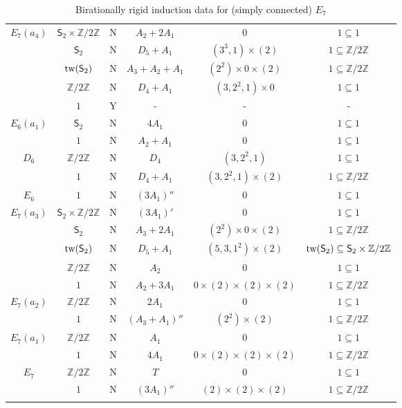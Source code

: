\documentclass[11pt]{amsart}
\newcommand{\bZ}{{\mathbb Z}}
\newcommand{\Sym}{{\mathsf{S}}}
\newcommand{\tw}{{{\mbox{\rm tw}}}}
\numberwithin{equation}{section}
\begin{document}
\begin{center}
\begin{longtable}{|c|c|c|c|c|c|}
			\hline
			$E_7(a_4)$ & $\Sym_2\times\bZ/2\bZ$ & N & $A_2 + 2 A_1$ & $0$ & $1\subseteq 1$ \\
			& $\Sym_2$ & N & $D_5 + A_1$ & $(3^3,1)\times (2)$ & $1\subseteq \bZ/2\bZ$ \\
			& $\tw(\Sym_2)$ & N & $A_3+A_2+A_1$ & $(2^2)\times 0\times (2)$ & $1\subseteq \bZ/2\bZ$ \\
			& $\bZ/2\bZ$ & N & $D_4+A_1$ & $(3,2^2,1)\times 0$ & $1\subseteq 1$ \\
			& $1$ & Y & - & - & - \\
			\hline
			$E_6(a_1)$ & $\Sym_2$ & N & $4 A_1$ & $0$ & $1\subseteq 1$ \\
			& $1$ & N & $A_2 + A_1$ & $0$ & $1\subseteq 1$\\
			\hline
			$D_6$ & $\bZ/2\bZ$ & N & $D_4$ & $(3,2^2,1)$ & $1\subseteq 1$ \\
			& $1$ & N & $D_4 + A_1$ & $(3,2^2,1)\times (2)$ & $1\subseteq \bZ/2\bZ$\\
			\hline
			$E_6$ & $1$ & N & $(3 A_1)''$ & $0$ & $1\subseteq 1$ \\
			\hline
			$E_7(a_3)$ & $\Sym_2\times\bZ/2\bZ$ & N & $(3 A_1)'$ & $0$ & $1\subseteq 1$ \\
			& $\Sym_2$ & N & $A_3 + 2 A_1$ & $(2^2)\times 0\times (2)$ & $1\subseteq \bZ/2\bZ$ \\
			& $\tw(\Sym_2)$ & N & $D_5 + A_1$ & $(5,3,1^2)\times (2)$ & $\tw(\Sym_2)\subseteq \Sym_2\times\bZ/2\bZ$ \\
			& $\bZ/2\bZ$& N & $A_2$ & $0$ & $1\subseteq 1$ \\
			& $1$ & N & $A_2 + 3 A_1$ & $0 \times (2) \times (2) \times (2)$ & $1\subseteq \bZ/2\bZ$ \\
			\hline
			$E_7(a_2)$ & $\bZ/2\bZ$ & N & $2 A_1$ & $0$ & $1\subseteq 1$ \\
			& $1$ & N & $(A_3 + A_1)''$ & $(2^2) \times (2)$ & $1\subseteq \bZ/2\bZ$ \\
			\hline
			$E_7(a_1)$ & $\bZ/2\bZ$ & N & $A_1$ & $0$ & $1\subseteq 1$ \\
			& $1$ & N & $4 A_1$ & $0\times (2)\times (2)\times (2) $ & $1\subseteq \bZ/2\bZ$ \\
			\hline
			$E_7$ & $\bZ/2\bZ$ & N & $T$ & $0$ & $1\subseteq 1$ \\
			& $1$  & N & $(3 A_1)''$ & $(2)\times(2)\times (2)$ & $1\subseteq \bZ/2\bZ$ \\
			\hline
			\caption{Birationally rigid induction data for (simply connected) $E_7$}\label{ta: E7}
		\end{longtable}
	\end{center}
	
\end{document}

